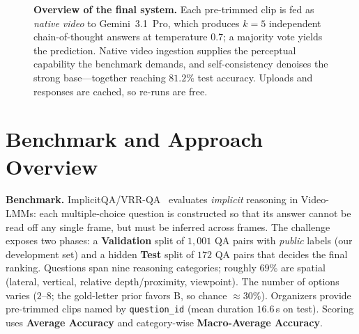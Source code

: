 \documentclass[10pt,twocolumn,letterpaper]{article}
\begin{document}
\begin{figure}[t]
\centering
{}
\caption{\textbf{Overview of the final system.} Each pre-trimmed clip is fed as \emph{native video}
to Gemini~3.1~Pro, which produces $k{=}5$ independent chain-of-thought answers at temperature $0.7$; a
majority vote yields the prediction. Native video ingestion supplies the perceptual capability the
benchmark demands, and self-consistency denoises the strong base---together reaching $81.2\%$ test
accuracy. Uploads and responses are cached, so re-runs are free.}
\label{fig:overview}
\end{figure}

\section{Benchmark and Approach Overview}
\textbf{Benchmark.} ImplicitQA/VRR-QA~\cite{implicitqa} evaluates \emph{implicit} reasoning in
Video-LMMs: each multiple-choice question is constructed so that its answer cannot be read off any
single frame, but must be inferred across frames. The challenge exposes two phases: a
\textbf{Validation} split of $1{,}001$ QA pairs with \emph{public} labels (our development set) and a
hidden \textbf{Test} split of $172$ QA pairs that decides the final ranking. Questions span nine
reasoning categories; roughly $69\%$ are spatial (lateral, vertical, relative depth/proximity,
viewpoint). The number of options varies ($2$--$8$; the gold-letter prior favors B, so chance
$\approx 30\%$). Organizers provide pre-trimmed clips named by \texttt{question\_id} (mean duration
$16.6$\,s on test). Scoring uses \textbf{Average Accuracy} and category-wise \textbf{Macro-Average
Accuracy}.
\end{document}
